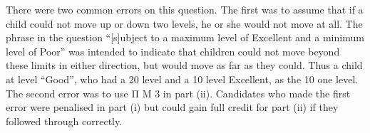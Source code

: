 \documentclass[a4paper,12pt]{article}
\begin{document}
\newpage
There were two common errors on this question. The first was to assume that if a child could
not move up or down two levels, he or she would not move at all. The phrase in the question
“[s]ubject to a maximum level of Excellent and a minimum level of Poor” was intended to
indicate that children could not move beyond these limits in either direction, but would move
as far as they could. Thus a child at level “Good”, who had a 20%
level and a 10%
level Excellent, as the 10%
one level. The second error was to use Π M 3 in part (ii). Candidates who made the first
error were penalised in part (i) but could gain full credit for part (ii) if they followed through
correctly.
\end{document}
